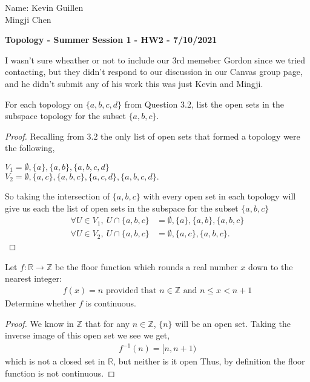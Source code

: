 \documentclass[12pt]{article}
\newcommand      {\Zm}         {{\mathbb Z}}
\newcommand      {\Rm}         {{\mathbb R}}
\begin{document}
\begin{flushright}
    Name:  Kevin Guillen \\ Mingji Chen 
    
\end{flushright}
\begin{center}
    {\bf Topology - Summer Session 1 - HW2 - 7/10/2021}
\end{center}

I wasn't sure wheather or not to include our 3rd memeber Gordon since we tried contacting, but they didn't respond to our discussion in our Canvas group page, and he didn't submit any of his work this was just Kevin and Mingji. 

  For each topology on $\{a, b, c, d\}$ from Question 3.2, list the open sets in the subspace topology for the 
subset $\{a, b, c\}$.
\begin{proof}
    Recalling from $3.2$ the only list of open sets that formed a topology were the following,
    \begin{center}
        $V_1 = \emptyset, \{a\}, \{a,b\}, \{a,b,c,d\}$ \\
        $V_2 = \emptyset, \{a,c\}, \{a,b,c\}, \{a,c,d\}, \{a,b,c,d\}.$ 
    \end{center}
    So taking the intersection of $\{a,b,c\}$ with every open set in each topology will give us each the list of open sets in the subspace for the subset $\{a,b,c\}$
    \begin{align*}
        \forall U \in V_1,\ U\cap \{a,b,c\} &= \emptyset, \{a\}, \{a,b\},\{a,b,c\} \\
        \forall U \in V_2,\ U \cap \{a,b,c\} &= \emptyset, \{a,c\},\{a,b,c\}.
    \end{align*}

\end{proof}

 Let $f:\Rm \to \Zm$ be the floor function which rounds a real number $x$ down to the nearest integer:
\begin{align*}
    f(x) = n \text{ provided that } n \in \Zm \text{ and } n \leq x < n+1
\end{align*}
Determine whether $f$ is continuous. 

\begin{proof}
    We know in $\Zm$ that for any $n\in \Zm$, $\{n\}$ will be an open set. Taking the inverse image of this open set we see we get,
    \begin{align*}
        f^{-1}(n) = [n,n+1)
    \end{align*}
    which is not a closed set in $\Rm$, but neither is it open Thus, by definition the floor function is not continuous.
\end{proof}
\end{document}
